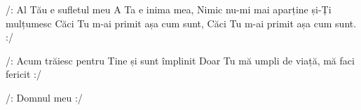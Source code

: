 
\beginverse
/: Al Tău e sufletul meu 
A Ta e inima mea,
Nimic nu-mi mai aparține și-Ți mulțumesc
Căci Tu m-ai primit așa cum sunt, 
Căci Tu m-ai primit așa cum sunt. :/
\endverse

\beginchorus
/: Acum trăiesc pentru Tine și sunt împlinit
Doar Tu mă umpli de viață, mă faci fericit :/ 

/: Domnul meu :/
\endchorus
\endsong